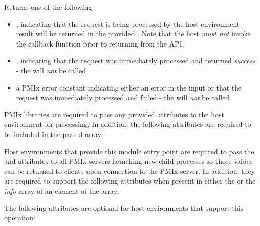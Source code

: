 Returns one of the following:

\begin{itemize}
    \item {}, indicating that the request is being processed by the host environment - result will be returned in the provided . Note that the host \emph{must not} invoke the callback function prior to returning from the \ac{API}.
    \item {}, indicating that the request was immediately processed and returned \textit{success} - the  will \textit{not} be called
    \item a PMIx error constant indicating either an error in the input or that the request was immediately processed and failed - the  will \textit{not} be called
\end{itemize}

\reqattrstart
\ac{PMIx} libraries are required to pass any provided attributes to the host environment for processing. In addition, the following attributes are required to be included in the passed  array:


Host environments that provide this module entry point are required to pass the  and  attributes to all \ac{PMIx} servers launching new child processes so those values can be returned to clients upon connection to the \ac{PMIx} server. In addition, they are required to support the following attributes when present in either the  or the \textit{info} array of an element of the  array:


\reqattrend

\optattrstart
The following attributes are optional for host environments that support this operation:

